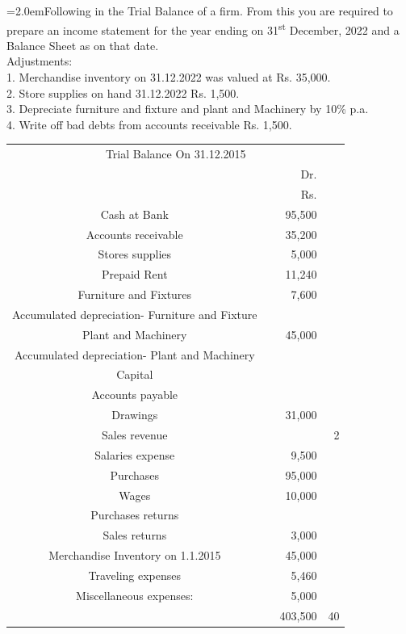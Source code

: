 \documentclass[11pt,a4paper]{article}
\newcommand{\lqn}[2]{\Needspace{6\baselineskip}\par\medskip\noindent\hangindent=2.0em\hangafter=1\makebox[2.0em][l]{\textbf{#1.}}#2\par}
\begin{document}
\lqn{120}{Following in the Trial Balance of a firm. From this you are required to prepare an income statement for the year ending on 31\textsuperscript{st} December, 2022 and a Balance Sheet as on that date.\\
Adjustments:\\
1. Merchandise inventory on 31.12.2022 was valued at Rs. 35,000.\\
2. Store supplies on hand 31.12.2022 Rs. 1,500.\\
3. Depreciate furniture and fixture and plant and Machinery by 10\% p.a.\\
4. Write off bad debts from accounts receivable Rs. 1,500.\par
\par\smallskip\noindent\hspace*{1.2em}\begin{tabular}{|ccrr|}
\hline
\multicolumn{4}{|c|}{Trial Balance On 31.12.2015} \\
 &  & Dr. &  \\
 &  & Rs. &  \\
Cash at Bank &  & 95,500 &  \\
Accounts receivable &  & 35,200 &  \\
Stores supplies &  & 5,000 &  \\
Prepaid Rent &  & 11,240 &  \\
Furniture and Fixtures &  & 7,600 &  \\
Accumulated depreciation- Furniture and Fixture &  &  &  \\
Plant and Machinery &  & 45,000 &  \\
Accumulated depreciation- Plant and Machinery &  &  &  \\
Capital &  &  &  \\
Accounts payable &  &  &  \\
Drawings &  & 31,000 &  \\
Sales revenue &  &  & 2 \\
Salaries expense &  & 9,500 &  \\
Purchases &  & 95,000 &  \\
Wages &  & 10,000 &  \\
Purchases returns &  &  &  \\
Sales returns &  & 3,000 &  \\
Merchandise Inventory on 1.1.2015 &  & 45,000 &  \\
Traveling expenses &  & 5,460 &  \\
Miscellaneous expenses: &  & 5,000 &  \\
 &  & 403,500 & 40 \\
\hline
\end{tabular}\par\smallskip
}
\end{document}
